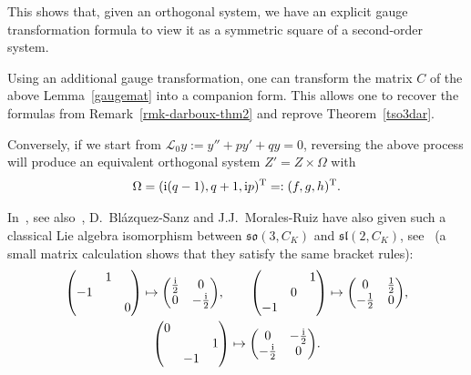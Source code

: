 \documentclass[pdftex]{sigma}%
\numberwithin{equation}{section}
\begin{document}
This shows that, given an orthogonal system, we have an explicit gauge transformation formula to view it as a symmetric square of a second-order system.

\begin{Remark}
Using an additional gauge transformation, one can transform the matrix $C$ of the above Lemma~\ref{gaugemat}
into a companion form. This allows one to recover the formulas from Remark~\ref{rmk-darboux-thm2} and reprove Theorem~\ref{tso3dar}.

Conversely, if we start from $ \mathcal{L}_0 y:= y''+ p y'+ q y=0$, reversing the above process will produce an equivalent orthogonal system $Z'=Z \times \Omega$ with
\begin{gather*}
\Omega=( {\rm i} (q-1) , q+1,{\rm i} p)^{\rm T} =: (f,g,h)^{\rm T}.
\end{gather*}
\end{Remark}

In~\cite{Blaz-M}, see also~\cite{Blaz}, D.~Bl\'azquez-Sanz and J.J.~Morales-Ruiz have also given such a classical Lie algebra isomorphism between $\mathfrak{so}(3, C_K)$ and $\mathfrak{sl} (2, C_K)$, see~\cite[Proposition~6.7]{Blaz-M} (a small matrix calculation shows that they satisfy the same bracket rules):
\begin{gather*}
 \begin{pmatrix} & 1 & \\ -1 & & \\ & & 0 \end{pmatrix} \mapsto \begin{pmatrix} \frac{\rm i}{2} & 0 \\ 0 & -\frac{\rm i}{2} \end{pmatrix}\!, \qquad
 \begin{pmatrix} & & 1 \\ & 0 & \\ -1 & & \end{pmatrix} \mapsto \begin{pmatrix} 0 & \frac{1}{2} \\ -\frac{1}{2} & 0 \end{pmatrix}\!, \\
 \begin{pmatrix} 0 & & \\ & & 1 \\ & -1 & \end{pmatrix} \mapsto \begin{pmatrix} 0 & -\frac{\rm i}{2} \\ -\frac{\rm i}{2} & 0 \end{pmatrix}\!.
\end{gather*}
\end{document}
